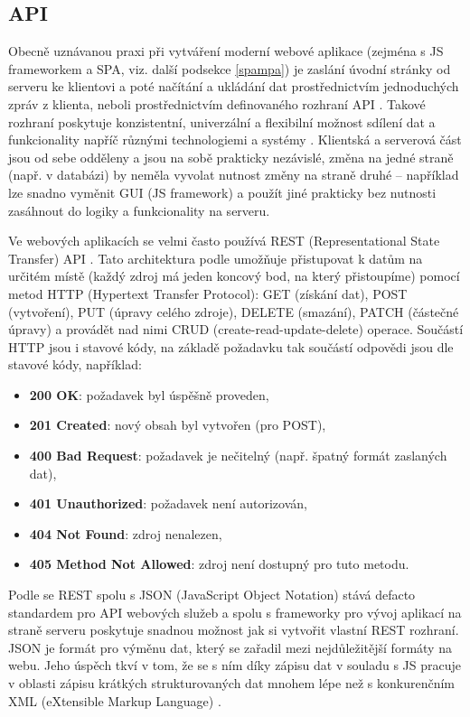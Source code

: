        \subsection{API}\label{api}
        Obecně uznávanou praxi při vytváření moderní webové aplikace (zejména s JS frameworkem a SPA, viz. další podsekce \ref{spampa}) je zaslání úvodní stránky od serveru ke klientovi a poté načítání a ukládání dat prostřednictvím jednoduchých zpráv z klienta, neboli prostřednictvím definovaného rozhraní API \cite{api1}. 
        Takové rozhraní poskytuje konzistentní, univerzální a flexibilní možnost sdílení dat a funkcionality napříč různými technologiemi a systémy \cite{api2}. Klientská a serverová část jsou od sebe odděleny a jsou na sobě prakticky nezávislé, změna na jedné straně (např. v databázi) by neměla vyvolat nutnost změny na straně druhé \cite{api3} -- například lze snadno vyměnit GUI (JS framework) a použít jiné prakticky bez nutnosti zasáhnout do logiky a funkcionality na serveru.
        
        Ve webových aplikacích se velmi často používá REST (Representational State Transfer) API \cite{api1}. Tato architektura podle \cite{api4} umožňuje přistupovat k datům na určitém místě (každý zdroj má jeden koncový bod, na který přistoupíme) pomocí metod HTTP (Hypertext Transfer Protocol): GET (získání dat), POST (vytvoření), PUT (úpravy celého zdroje), DELETE (smazání), PATCH (částečné úpravy) a provádět nad nimi CRUD (create-read-update-delete) operace. Součástí HTTP jsou i stavové kódy, na základě požadavku tak součástí odpovědi jsou dle \cite{api4} stavové kódy, například:
            \begin{itemize}
                \item \textbf{200 OK}: požadavek byl úspěšně proveden,
                \item \textbf{201 Created}: nový obsah byl vytvořen (pro POST),
                \item \textbf{400 Bad Request}: požadavek je nečitelný (např. špatný formát zaslaných dat),
                \item \textbf{401 Unauthorized}: požadavek není autorizován,
                \item \textbf{404 Not Found}: zdroj nenalezen,
                \item \textbf{405 Method Not Allowed}: zdroj není dostupný pro tuto metodu.
            \end{itemize}
        Podle \cite{api5} se REST spolu s JSON (JavaScript Object Notation) stává defacto standardem pro API webových služeb a spolu s frameworky pro vývoj aplikací na straně serveru poskytuje snadnou možnost jak si vytvořit vlastní REST rozhraní. JSON je formát pro výměnu dat, který se zařadil mezi nejdůležitější formáty na webu. Jeho úspěch tkví v tom, že se s ním díky zápisu dat v souladu s JS pracuje v oblasti zápisu krátkých strukturovaných dat mnohem lépe než s konkurenčním XML (eXtensible Markup Language) \cite{api6}.
        
